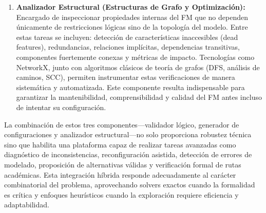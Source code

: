 {{\begin{enumerate}
            \item \textbf{Analizador Estructural (Estructuras de Grafo y Optimización):}
            Encargado de inspeccionar propiedades internas del \ac{FM} que no dependen únicamente 
            de restricciones lógicas sino de la topología del modelo. Entre estas 
            tareas se incluyen: detección de características inaccesibles 
            (dead features), redundancias, relaciones implícitas, dependencias 
            transitivas, componentes fuertemente conexas y métricas de impacto. 
            Tecnologías como NetworkX, junto con algoritmos clásicos de teoría de 
            grafos (\ac{DFS}, análisis de caminos, \ac{SCC}), permiten instrumentar estas 
            verificaciones de manera sistemática y automatizada. Este componente 
            resulta indispensable para garantizar la mantenibilidad, comprensibilidad 
            y calidad del FM antes incluso de intentar su configuración.
        \end{enumerate}

        La combinación de estos tres componentes—validador lógico, 
        generador de configuraciones y analizador estructural—no solo 
        proporciona robustez técnica sino que habilita una plataforma capaz de 
        realizar tareas avanzadas como diagnóstico de inconsistencias, 
        reconfiguración asistida, detección de errores de modelado, proposición 
        de alternativas válidas y verificación formal de rutas académicas. 
        Esta integración híbrida responde adecuadamente al carácter 
        combinatorial del problema, aprovechando solvers exactos cuando la 
        formalidad es crítica y enfoques heurísticos cuando la exploración 
        requiere eficiencia y adaptabilidad.
    }


    }
